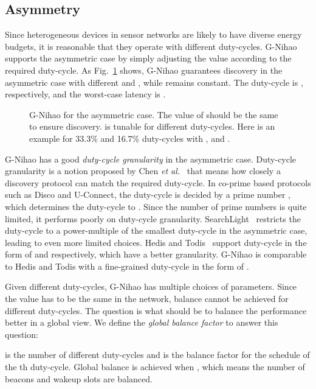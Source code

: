 \documentclass[conference]{IEEEtran}
\begin{document}
\subsection{Asymmetry}
Since heterogeneous devices in sensor networks are likely to have diverse energy budgets,
it is reasonable that they operate with different duty-cycles.
G-Nihao supports the asymmetric case by simply adjusting the  value according to the required duty-cycle.
As Fig.~\ref{asymmetricnihao} shows, G-Nihao guarantees discovery in the asymmetric case with different  and , while  remains constant.
The duty-cycle is ,  respectively,
and the worst-case latency is .

\begin{figure}[t]
    \centering

    \caption{G-Nihao for the asymmetric case.
        The value of  should be the same to ensure discovery.
         is tunable for different duty-cycles.
        Here is an example for 33.3\% and 16.7\% duty-cycles with ,  and .}\label{asymmetricnihao}
\end{figure}

G-Nihao has a good \emph{duty-cycle granularity} in the asymmetric case.
Duty-cycle granularity is a notion proposed by Chen \emph{et al.}~\cite{chen2015infocom} that means how closely a discovery protocol can match the required duty-cycle.
In co-prime based protocols such as Disco and U-Connect, the duty-cycle is decided by a prime number , which determines the duty-cycle to .
Since the number of prime numbers is quite limited, it performs poorly on duty-cycle granularity.
SearchLight~\cite{bakht2012mobicom} restricts the duty-cycle to a power-multiple of the smallest duty-cycle in the asymmetric case, leading to even more limited choices.
Hedis and Todis~\cite{chen2015infocom} support duty-cycle in the form of  and  respectively, which have a better granularity.
G-Nihao is comparable to Hedis and Todis with a fine-grained duty-cycle in the form of .

Given different duty-cycles, G-Nihao has multiple choices of parameters.
Since the value  has to be the same in the network, balance cannot be achieved for different duty-cycles.
The question is what  should be to balance the performance better in a global view.
We define the \emph{global balance factor}  to answer this question:

 is the number of different duty-cycles and  is the balance factor for the schedule of the th duty-cycle.
Global balance is achieved when , which means the number of beacons and wakeup slots are balanced.
\end{document}
